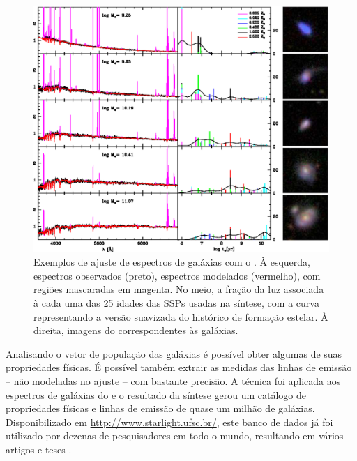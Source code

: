 \begin{figure}
	\includegraphics[width=1.0\textwidth]{figuras/starlight-fit.eps}
	\caption[Exemplos de ajuste de espectro com o \starlight.]
	{Exemplos de ajuste de espectros de galáxias com o \starlight
	\citep{Asari2007}. À esquerda, espectros observados (preto), espectros
	modelados (vermelho), com regiões mascaradas em magenta. No meio, a fração da
	luz associada à cada uma das 25 idades das SSPs usadas na síntese, com a curva
	representando a versão suavizada do histórico de formação estelar. À direita,
	imagens do \SDSS correspondentes às galáxias.}
	\label{fig:StarlightSpectrumSample}
\end{figure}

Analisando o vetor de população das galáxias é possível obter algumas de suas
propriedades físicas. É possível também extrair as medidas das linhas de emissão
-- não modeladas no ajuste -- com bastante precisão. A técnica foi aplicada aos
espectros de galáxias do \SDSS e o resultado da síntese gerou um catálogo de
propriedades físicas e linhas de emissão de quase um milhão de galáxias.
Disponibilizado em \url{http://www.starlight.ufsc.br/}, este banco de dados já
foi utilizado por dezenas de pesquisadores em todo o mundo, resultando em vários
artigos \citep[para citar alguns]{Bian2006, Liang2007, Peeples2009,
Lara-Lopez2009, Lara-Lopez2010} e teses \citep{Mateus2006, Gomes2009,
Asari2010}.




